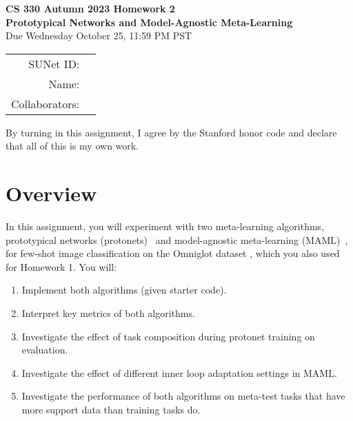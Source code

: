 \documentclass[12pt]{article}
\begin{document}
\begin{center}
{{\Large \textbf{CS 330 Autumn 2023 Homework 2 \\ Prototypical Networks and Model-Agnostic Meta-Learning}}
\\ {\large Due Wednesday October 25, 11:59 PM PST}}
    

\begin{tabular}{rl}
SUNet ID: &  \\
Name: & \\
Collaborators: & 
\end{tabular}
\end{center}

By turning in this assignment, I agree by the Stanford honor code and declare that all of this is my own work.

\section*{Overview}

In this assignment, you will experiment with two meta-learning algorithms, prototypical networks (protonets)~\cite{prototypical} and model-agnostic meta-learning (MAML)~\cite{maml}, for few-shot image classification on the Omniglot dataset \cite{Lake1332}, which you also used for Homework 1. You will:
\begin{enumerate}
    \item Implement both algorithms (given starter code).
    \item Interpret key metrics of both algorithms.
    \item Investigate the effect of task composition during protonet training on evaluation.
    \item Investigate the effect of different inner loop adaptation settings in MAML.
    \item Investigate the performance of both algorithms on meta-test tasks that have more support data than training tasks do.
\end{enumerate}
\end{document}
